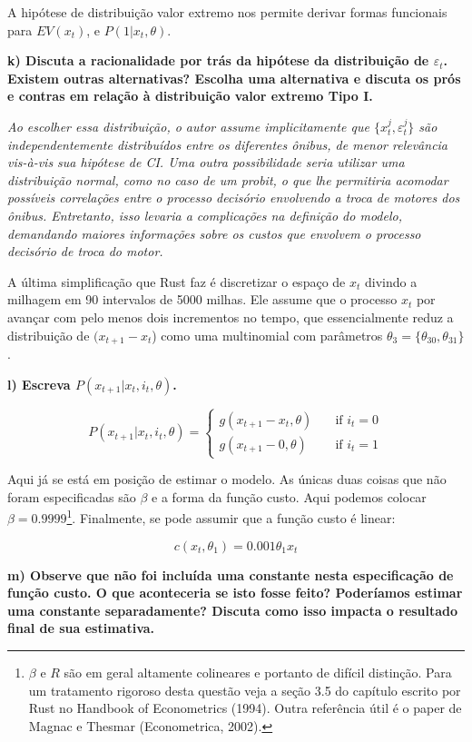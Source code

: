 \documentclass[12pt,a4paper]{article}
\let\rmarkdownfootnote\footnote%
\def\footnote{\protect\rmarkdownfootnote}
\begin{document}
A hipótese de distribuição valor extremo nos permite derivar formas
funcionais para \(EV(x_t)\), e \(P(1 | x_t, \theta)\).

\textbf{k) Discuta a racionalidade por trás da hipótese da distribuição
de \(\varepsilon_t\). Existem outras alternativas? Escolha uma
alternativa e discuta os prós e contras em relação à distribuição valor
extremo Tipo I.}

\emph{Ao escolher essa distribuição, o autor assume implicitamente que
\(\{x_t^j,\varepsilon_t^j\}\) são independentemente distribuídos entre
os diferentes ônibus, de menor relevância vis-à-vis sua hipótese de CI.
Uma outra possibilidade seria utilizar uma distribuição normal, como no
caso de um probit, o que lhe permitiria acomodar possíveis correlações
entre o processo decisório envolvendo a troca de motores dos ônibus.
Entretanto, isso levaria a complicações na definição do modelo,
demandando maiores informações sobre os custos que envolvem o processo
decisório de troca do motor.}

A última simplificação que Rust faz é discretizar o espaço de \(x_t\)
divindo a milhagem em 90 intervalos de 5000 milhas. Ele assume que o
processo \(x_t\) por avançar com pelo menos dois incrementos no tempo,
que essencialmente reduz a distribuição de \((x_{t+1} - x_t\)) como uma
multinomial com parâmetros \(\theta_3 = \{\theta_{30}, \theta_{31}\}\).

\textbf{l) Escreva \(P (x_{t+1}| x_t, i_t, \theta)\).}

\[
P (x_{t+1}| x_t, i_t, \theta) =
\begin{cases}
  g(x_{t+1} - x_t,\theta) & \quad \text{if } i_t=0 \\
  g(x_{t+1} - 0,\theta) & \quad \text{if } i_t=1
\end{cases}
\]

Aqui já se está em posição de estimar o modelo. As únicas duas coisas
que não foram especificadas são \(\beta\) e a forma da função custo.
Aqui podemos colocar \(\beta = 0.9999\)\footnote{\(\beta\) e \(R\) são
  em geral altamente colineares e portanto de difícil distinção. Para um
  tratamento rigoroso desta questão veja a seção 3.5 do capítulo escrito
  por Rust no Handbook of Econometrics (1994). Outra referência útil é o
  paper de Magnac e Thesmar (Econometrica, 2002).}. Finalmente, se pode
assumir que a função custo é linear:

\[
c (x_t, \theta_1) = 0.001 \theta_1 x_t
\]

\textbf{m) Observe que não foi incluída uma constante nesta
especificação de função custo. O que aconteceria se isto fosse feito?
Poderíamos estimar uma constante separadamente? Discuta como isso
impacta o resultado final de sua estimativa.}
\end{document}
